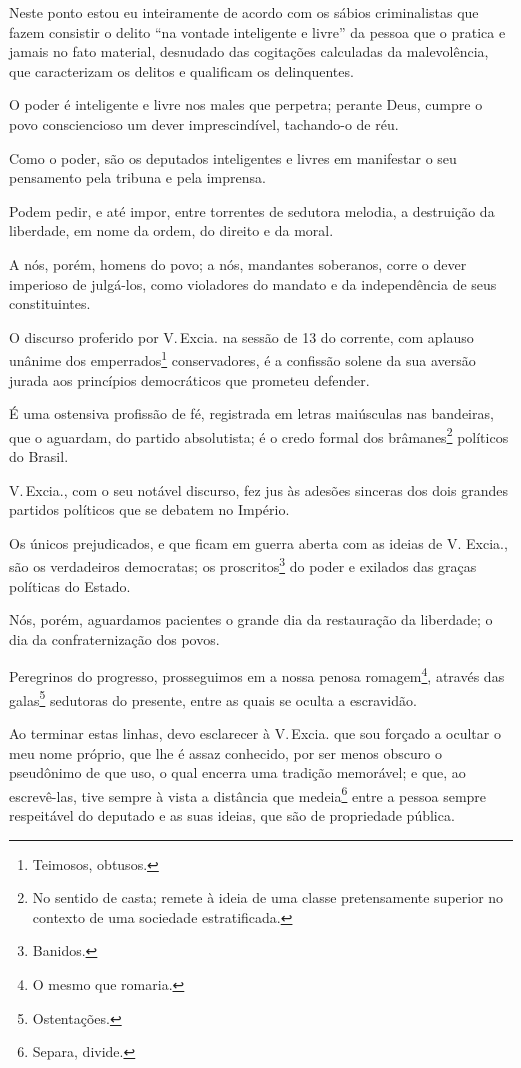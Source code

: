 Neste ponto estou eu inteiramente de acordo com os sábios criminalistas
que fazem consistir o delito ``na vontade inteligente e livre'' da pessoa
que o pratica e jamais no fato material, desnudado das cogitações
calculadas da malevolência, que caracterizam os delitos e qualificam os
delinquentes.

O poder é inteligente e livre nos males que perpetra; perante Deus,
cumpre o povo consciencioso um dever imprescindível, tachando-o de réu.

Como o poder, são os deputados inteligentes e livres em manifestar o seu
pensamento pela tribuna e pela imprensa.

Podem pedir, e até impor, entre torrentes de sedutora melodia, a
destruição da liberdade, em nome da ordem, do direito e da moral.

A nós, porém, homens do povo; a nós, mandantes soberanos, corre o dever
imperioso de julgá-los, como violadores do mandato e da independência de
seus constituintes.

O discurso proferido por V.\,Excia. na sessão de 13 do corrente, com
aplauso unânime dos emperrados\footnote{Teimosos, obtusos.}
conservadores, é a confissão solene da sua aversão jurada aos princípios
democráticos que prometeu defender.

É uma ostensiva profissão de fé, registrada em letras maiúsculas nas
bandeiras, que o aguardam, do partido absolutista; é o credo formal dos
brâmanes\footnote{No sentido de casta; remete à ideia de uma classe
  pretensamente superior no contexto de uma sociedade estratificada.}
políticos do Brasil.

V.\,Excia., com o seu notável discurso, fez jus às adesões sinceras dos
dois grandes partidos políticos que se debatem no Império.

Os únicos prejudicados, e que ficam em guerra aberta com as ideias de V.
Excia., são os verdadeiros democratas; os proscritos\footnote{Banidos.}
do poder e exilados das graças políticas do Estado.

Nós, porém, aguardamos pacientes o grande dia da restauração da
liberdade; o dia da confraternização dos povos.

Peregrinos do progresso, prosseguimos em a nossa penosa
romagem\footnote{O mesmo que romaria.}, através das galas\footnote{
  Ostentações.} sedutoras do presente, entre as quais se oculta a
escravidão.

Ao terminar estas linhas, devo esclarecer à V.\,Excia. que sou forçado a
ocultar o meu nome próprio, que lhe é assaz conhecido, por ser menos
obscuro o pseudônimo de que uso, o qual encerra uma tradição memorável;
e que, ao escrevê-las, tive sempre à vista a distância que
medeia\footnote{Separa, divide.} entre a pessoa sempre respeitável do
deputado e as suas ideias, que são de propriedade pública.

